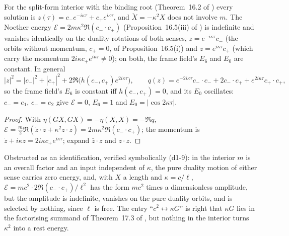 \begin{proposition}
\label{d1:prop:interior}
For the split-form interior with the binding root (Theorem~16.2 of \cite{ES17}) every solution is $z(\tau)=c_-e^{-i\kappa\tau}+c_+e^{i\kappa\tau}$, and
$\ddot X=-\kappa^2X$ does not involve $m$. The Noether energy $\mathcal E=2m\kappa^2\Re(c_-\cdot c_+)$ (Proposition~16.5(iii) of \cite{ES17}) is indefinite
and vanishes identically on the duality rotations of both senses, $z=e^{-i\kappa\tau}c_-$ (the orbits without momentum, $c_+=0$, of
Proposition~16.5(i)) and $z=e^{i\kappa\tau}c_+$ (which carry the momentum $2i\kappa c_+e^{i\kappa\tau}\neq0$); on both, the frame field's $E_6$ and $E_0$ are
constant. In general
\[
|z|^2=|c_-|^2+|c_+|^2+2\Re\bigl(h(c_-,c_+)e^{2i\kappa\tau}\bigr),\qquad q(z)=e^{-2i\kappa\tau}c_-\cdot c_-+2c_-\cdot c_++e^{2i\kappa\tau}c_+\cdot c_+,
\]
so the frame field's $E_6$ is constant iff $h(c_-,c_+)=0$, and its $E_0$ oscillates: $c_-=e_1$, $c_+=e_2$ give $\mathcal E=0$, $E_6=1$ and
$E_0=|\cos2\kappa\tau|$.
\end{proposition}

\begin{proof}
With $\eta(GX,GX)=-\eta(X,X)=-\Re q$, $\mathcal E=\tfrac m2\Re(\dot z\cdot\dot z+\kappa^2z\cdot z)=2m\kappa^2\Re(c_-\cdot c_+)$; the momentum is
$\dot z+i\kappa z=2i\kappa c_+e^{i\kappa\tau}$; expand $\bar z\cdot z$ and $z\cdot z$.
\end{proof}

Obstructed as an identification, verified symbolically (d1-9): in the interior $m$ is an overall factor and an input independent of $\kappa$, the
pure duality motion of either sense carries zero energy, and, with $X$ a length and $\kappa=c/\ell$, $\mathcal E=mc^2\cdot2\Re(c_-\cdot c_+)/\ell^2$ has the
form $mc^2$ times a dimensionless amplitude, but the amplitude is indefinite, vanishes on the pure duality orbits, and is selected by nothing, since
$\ell$ is free. The entry ``$c^2\leftrightarrow\kappa G$'' is right that $\kappa G$ lies in the factorising summand of Theorem~17.3 of \cite{ES17}, but
nothing in the interior turns $\kappa^2$ into a rest energy.

